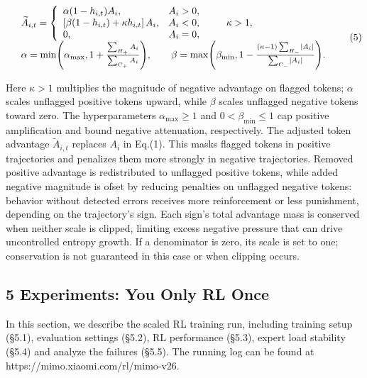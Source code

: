 \documentclass[
  10
]{article}
\begin{document}
\[
\begin{array} { r l } & { \widetilde { A } _ { i , t } = \left\{ \begin{array} { l l } { \alpha ( 1 - h _ { i , t } ) A _ { i } , } & { A _ { i } > 0 , } \\ { \left[ \beta ( 1 - h _ { i , t } ) + \kappa h _ { i , t } \right] A _ { i } , } & { A _ { i } < 0 , } \\ { 0 , } & { A _ { i } = 0 , } \end{array} \right. \qquad \kappa > 1 , } \\ & { \alpha = \operatorname* { m i n } \Biggl ( \alpha _ { \operatorname* { m a x } } , 1 + \frac { \sum _ { H _ { + } } A _ { i } } { \sum _ { C _ { + } } A _ { i } } \Biggr ) , \qquad \beta = \operatorname* { m a x } \Biggl ( \beta _ { \operatorname* { m i n } } , 1 - \frac { \left( \kappa - 1 \right) \sum _ { H _ { - } } \left| A _ { i } \right| } { \sum _ { C _ { - } } \left| A _ { i } \right| } \Biggr ) . } \end{array}\tag{5}
\]

Here \(\kappa > 1\) multiplies the magnitude of negative advantage on
flagged tokens; \(\alpha\) scales unflagged positive tokens upward,
while \(\beta\) scales unflagged negative tokens toward zero. The
hyperparameters \(\alpha _ { \operatorname* { m a x } } \geq 1\) and
\(0 < \beta _ { \mathrm { m i n } } \le 1\) cap positive amplification
and bound negative attenuation, respectively. The adjusted token
advantage \(\widetilde { A } _ { i , t }\) replaces \(A _ { i }\) in
Eq.(1). This masks flagged tokens in positive trajectories and penalizes
them more strongly in negative trajectories. Removed positive advantage
is redistributed to unflagged positive tokens, while added negative
magnitude is ofset by reducing penalties on unflagged negative tokens:
behavior without detected errors receives more reinforcement or less
punishment, depending on the trajectory's sign. Each sign's total
advantage mass is conserved when neither scale is clipped, limiting
excess negative pressure that can drive uncontrolled entropy growth. If
a denominator is zero, its scale is set to one; conservation is not
guaranteed in this case or when clipping occurs.

\subsection{5 Experiments: You Only RL
Once}\label{experiments-you-only-rl-once}

In this section, we describe the scaled RL training run, including
training setup (§5.1), evaluation settings (§5.2), RL performance
(§5.3), expert load stability (§5.4) and analyze the failures (§5.5).
The running log can be found at https://mimo.xiaomi.com/rl/mimo-v26.
\end{document}
